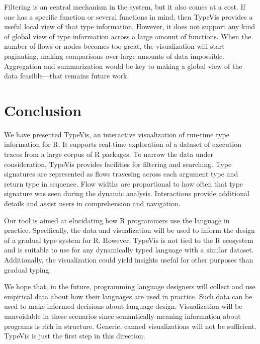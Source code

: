 \documentclass{vgtc}                          %
\begin{document}
Filtering is an central mechanism in the system,
but it also comes at a cost.
If one has a specific function or several functions
in mind, then {\sc TypeVis} provides a useful
local view of that type information.
However, it does not support any kind of global
view of type information across a large amount of
functions. When the number of flows or nodes
becomes too great, the visualization will start
paginating, making comparisons over large amounts
of data impossible.
Aggregation and summarization would be key to
making a global view of the data feasible---that
remains future work.


\section{Conclusion}

We have presented {\sc TypeVis}, an interactive visualization
of run-time type information for R.
It supports real-time exploration of a dataset of
execution traces from a large corpus of R packages.
To narrow the data under consideration,
{\sc TypeVis} provides facilities for filtering
and searching.
Type signatures are represented as flows travesing across
each argument type and return type in sequence.
Flow widths are proportional to how often
that type signature was seen during the dynamic analysis.
Interactions provide additional details and
assist users in comprehension and navigation.

Our tool is aimed at elucidating how R programmers
use the language in practice.
Specifically, the data and visualization will be used to
inform the design of a gradual type system for R.
However, {\sc TypeVis} is not tied to the R ecosystem
and is suitable to use for any dynamically typed language
with a similar dataset.
Additionally, the visualization could yield insights
useful for other purposes than gradual typing.

We hope that, in the future, programming language designers
will collect and use empirical data about how their languages
are used in practice.
Such data can be used to make informed decisions about
language design.
Visualization will be unavoidable in these scenarios
since semantically-meaning information about programs
is rich in structure.
Generic, canned visualizations will not be sufficient.
{\sc TypeVis} is just the first step in this direction.





\end{document}
